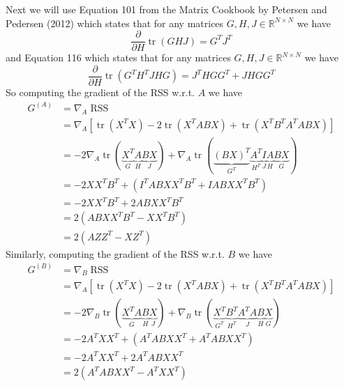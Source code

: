 \documentclass[oneside]{article}
\begin{document}
Next we will use Equation 101 from the Matrix Cookbook by Petersen and Pedersen (2012) \autocite{petersenMatrixCookbook2012} which states that for any matrices $G, H, J \in \mathbb{R}^{N \times N}$ we have
\begin{equation}
\frac{\partial}{\partial H}\operatorname{tr}(GHJ) = G^T J^T
\end{equation}
and Equation 116 which states that for any matrices $G, H, J \in \mathbb{R}^{N \times N}$ we have
\begin{equation}
\frac{\partial}{\partial H}\operatorname{tr}(G^T H^T J H G) = J^T H G G^T + J H G G^T
\end{equation}
So computing the gradient of the RSS w.r.t. $A$ we have
\begin{equation}
\begin{aligned}
G^{(A)} &= \nabla_A \operatorname{RSS} \\
&=\nabla_A \left[ \operatorname{tr}(X^T X) - 2 \operatorname{tr}(X^T A B X) + \operatorname{tr}(X^T B^T A^T A B X) \right] \\
&= - 2 \nabla_A \operatorname{tr}(\underbrace{X^T}_{G} \underbrace{A}_{H} \underbrace{B X}_{J}) + \nabla_A \operatorname{tr}(\underbrace{(B X)^T}_{G^T} \underbrace{A^T}_{H^T} \underbrace{I}_{J} \underbrace{A}_{H} \underbrace{B X}_{G}) \\
&= - 2 X X^T B^T + \left( I^T A B X X^T B^T + I A B X X^T B^T \right) \\
&= - 2 X X^T B^T + 2 A B X X^T B^T \\
&= 2 \left( A B X X^T B^T - X X^T B^T \right) \\
&= 2 \left( A Z Z^T - X Z^T \right)
\end{aligned}
\end{equation}
Similarly, computing the gradient of the RSS w.r.t. $B$ we have
\begin{equation}
\begin{aligned}
G^{(B)} &= \nabla_B \operatorname{RSS} \\
&= \nabla_A \left[ \operatorname{tr}(X^T X) - 2 \operatorname{tr}(X^T A B X) + \operatorname{tr}(X^T B^T A^T A B X) \right] \\
&= - 2 \nabla_B \operatorname{tr}(\underbrace{X^T A}_{G} \underbrace{B}_{H} \underbrace{X}_{J}) + \nabla_B \operatorname{tr}(\underbrace{X^T}_{G^T} \underbrace{B^T}_{H^T} \underbrace{A^T A}_{J} \underbrace{B}_{H} \underbrace{X}_{G}) \\
& = - 2 A^T X X^T + \left( A^T A B X X^T + A^T A B X X^T \right) \\
& = - 2 A^T X X^T + 2 A^T A B X X^T  \\
& = 2 \left( A^T A B X X^T - A^T X X^T \right)
\end{aligned}
\end{equation}
\end{document}
